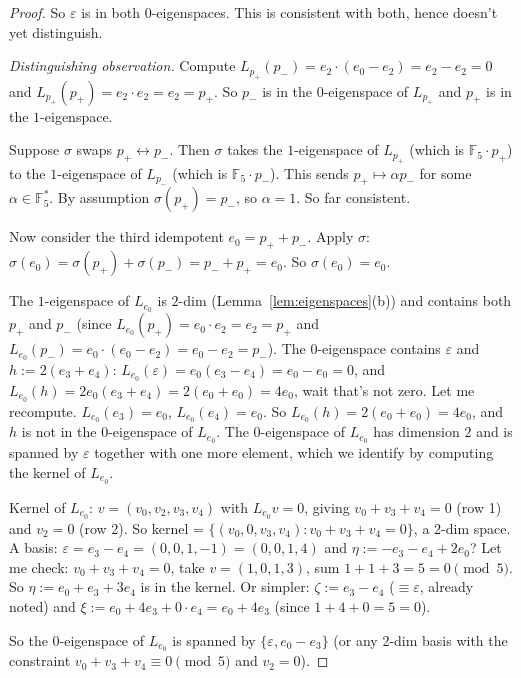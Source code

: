 \documentclass[11pt,reqno]{amsart}
\theoremstyle{plain}
\theoremstyle{definition}
\theoremstyle{remark}
\newcommand{\F}{\mathbb{F}}
\begin{document}
\begin{proof}
So $\varepsilon$ is in both $0$-eigenspaces. This is consistent with both, hence doesn't yet distinguish.

\emph{Distinguishing observation.} Compute $L_{p_+}(p_-) = e_2 \cdot (e_0 - e_2) = e_2 - e_2 = 0$ and $L_{p_+}(p_+) = e_2 \cdot e_2 = e_2 = p_+$. So $p_-$ is in the $0$-eigenspace of $L_{p_+}$ and $p_+$ is in the $1$-eigenspace.

Suppose $\sigma$ swaps $p_+ \leftrightarrow p_-$. Then $\sigma$ takes the $1$-eigenspace of $L_{p_+}$ (which is $\F_5 \cdot p_+$) to the $1$-eigenspace of $L_{p_-}$ (which is $\F_5 \cdot p_-$). This sends $p_+ \mapsto \alpha p_-$ for some $\alpha \in \F_5^*$. By assumption $\sigma(p_+) = p_-$, so $\alpha = 1$. So far consistent.

Now consider the third idempotent $e_0 = p_+ + p_-$. Apply $\sigma$: $\sigma(e_0) = \sigma(p_+) + \sigma(p_-) = p_- + p_+ = e_0$. So $\sigma(e_0) = e_0$.

The $1$-eigenspace of $L_{e_0}$ is $2$-dim (Lemma~\ref{lem:eigenspaces}(b)) and contains both $p_+$ and $p_-$ (since $L_{e_0}(p_+) = e_0 \cdot e_2 = e_2 = p_+$ and $L_{e_0}(p_-) = e_0 \cdot (e_0 - e_2) = e_0 - e_2 = p_-$). The $0$-eigenspace contains $\varepsilon$ and $h := 2(e_3 + e_4)$: $L_{e_0}(\varepsilon) = e_0(e_3 - e_4) = e_0 - e_0 = 0$, and $L_{e_0}(h) = 2 e_0 (e_3 + e_4) = 2(e_0 + e_0) = 4 e_0$, wait that's not zero. Let me recompute. $L_{e_0}(e_3) = e_0$, $L_{e_0}(e_4) = e_0$. So $L_{e_0}(h) = 2(e_0 + e_0) = 4 e_0$, and $h$ is not in the $0$-eigenspace of $L_{e_0}$. The $0$-eigenspace of $L_{e_0}$ has dimension $2$ and is spanned by $\varepsilon$ together with one more element, which we identify by computing the kernel of $L_{e_0}$.

Kernel of $L_{e_0}$: $v = (v_0, v_2, v_3, v_4)$ with $L_{e_0} v = 0$, giving $v_0 + v_3 + v_4 = 0$ (row 1) and $v_2 = 0$ (row 2). So kernel = $\{(v_0, 0, v_3, v_4) : v_0 + v_3 + v_4 = 0\}$, a 2-dim space. A basis: $\varepsilon = e_3 - e_4 = (0, 0, 1, -1) = (0, 0, 1, 4)$ and $\eta := -e_3 - e_4 + 2 e_0$? Let me check: $v_0 + v_3 + v_4 = 0$, take $v = (1, 0, 1, 3)$, sum $1 + 1 + 3 = 5 = 0 \pmod 5$. So $\eta := e_0 + e_3 + 3 e_4$ is in the kernel. Or simpler: $\zeta := e_3 - e_4$ ($\equiv \varepsilon$, already noted) and $\xi := e_0 + 4 e_3 + 0 \cdot e_4 = e_0 + 4 e_3$ (since $1 + 4 + 0 = 5 = 0$).

So the $0$-eigenspace of $L_{e_0}$ is spanned by $\{\varepsilon, e_0 - e_3\}$ (or any 2-dim basis with the constraint $v_0 + v_3 + v_4 \equiv 0 \pmod 5$ and $v_2 = 0$).


\end{proof}
\end{document}
